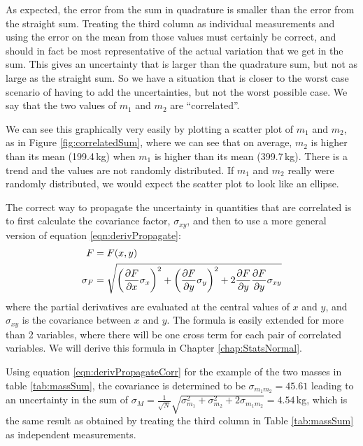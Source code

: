 As expected, the error from the sum in quadrature is smaller than the error from the straight sum. Treating the third column as individual measurements and using the error on the mean from those values must certainly be correct, and should in fact be most representative of the actual variation that we get in the sum. This gives an uncertainty that is larger than the quadrature sum, but not as large as the straight sum. So we have a situation that is closer to the worst case scenario of having to add the uncertainties, but not the worst possible case. We say that the two values of $m_1$ and $m_2$ are ``correlated''. 

We can see this graphically very easily by plotting a scatter plot of $m_1$ and $m_2$, as in Figure \ref{fig:correlatedSum}, where we can see that on average, $m_2$ is higher than its mean (199.4\,kg) when $m_1$ is higher than its mean (399.7\,kg). There is a trend and the values are not randomly distributed. If $m_1$ and $m_2$ really were randomly distributed, we would expect the scatter plot to look like an ellipse. 


The correct way to propagate the uncertainty in quantities that are correlated is to first calculate the covariance factor, $\sigma_{xy}$, and then to use a more general version of equation \ref{eqn:derivPropagate}:
\begin{align}
\label{eqn:derivPropagateCorr}
F&=F(x,y)\nonumber\\
\sigma_F &= \sqrt{\left(\frac{\partial F}{\partial x}\sigma_x\right)^2 + \left(\frac{\partial F}{\partial y} \sigma_y\right)^2+2\frac{\partial F}{\partial y}\frac{\partial F}{\partial y}\sigma_{xy}}
\end{align}
where the partial derivatives are evaluated at the central values of $x$ and $y$, and $\sigma_{xy}$ is the covariance between $x$ and $y$. The formula is easily extended for more than 2 variables, where there will be one cross term for each pair of correlated variables. We will derive this formula in Chapter \ref{chap:StatsNormal}.

Using equation \ref{eqn:derivPropagateCorr} for the example of the two masses in table \ref{tab:massSum}, the covariance is determined to be $\sigma_{m_1m_2}=45.61$ leading to an uncertainty in the sum of $\sigma_M=\frac{1}{\sqrt{N}}\sqrt{\sigma_{m_1}^2+\sigma_{m_2}^2+2\sigma_{m_1m_2}}=4.54$\,kg, which is the same result as obtained by treating the third column in Table \ref{tab:massSum} as independent measurements.

